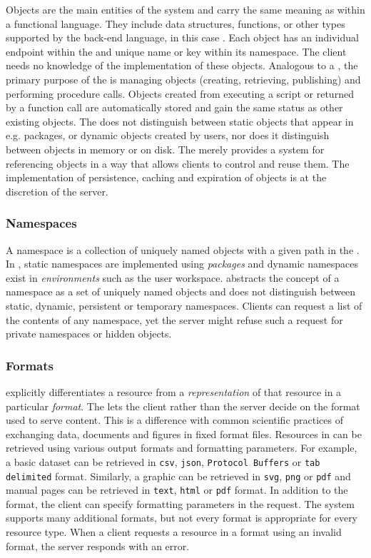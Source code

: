 Objects are the main entities of the system and carry the same meaning as within a functional language. They include data structures, functions, or other types supported by the back-end language, in this case \R. Each object has an individual endpoint within the \API and unique name or key within its namespace. The client needs no knowledge of the implementation of these objects. Analogous to a \UI, the primary purpose of the \API is managing objects (creating, retrieving, publishing) and performing procedure calls. Objects created from executing a script or returned by a function call are automatically stored and gain the same status as other existing objects. The \API does not distinguish between static objects that appear in e.g. packages, or dynamic objects created by users, nor does it distinguish between objects in memory or on disk. The \API merely provides a system for referencing objects in a way that allows clients to control and reuse them. The implementation of persistence, caching and expiration of objects is at the discretion of the server. 

\subsubsection{Namespaces}

A namespace is a collection of uniquely named objects with a given path in the \API. In \R, static namespaces are implemented using \emph{packages} and dynamic namespaces exist in \emph{environments} such as the user workspace. \OpenCPU abstracts the concept of a namespace as a set of uniquely named objects and does not distinguish between static, dynamic, persistent or temporary namespaces. Clients can request a list of the contents of any namespace, yet the server might refuse such a request for private namespaces or hidden objects. 

\subsubsection{Formats}

\OpenCPU explicitly differentiates a resource from a \emph{representation} of that resource in a particular \emph{format}. The \API lets the client rather than the server decide on the format used to serve content. This is a difference with common scientific practices of exchanging data, documents and figures in fixed format files. Resources in \OpenCPU can be retrieved using various output formats and formatting parameters. For example, a basic dataset can be retrieved in \texttt{csv}, \texttt{json}, \texttt{Protocol Buffers} or \texttt{tab delimited} format. Similarly, a graphic can be retrieved in \texttt{svg}, \texttt{png} or \texttt{pdf} and manual pages can be retrieved in \texttt{text}, \texttt{html} or \texttt{pdf} format. In addition to the format, the client can specify formatting parameters in the request. The system supports many additional formats, but not every format is appropriate for every resource type. When a client requests a resource in a format using an invalid format, the server responds with an error.   


